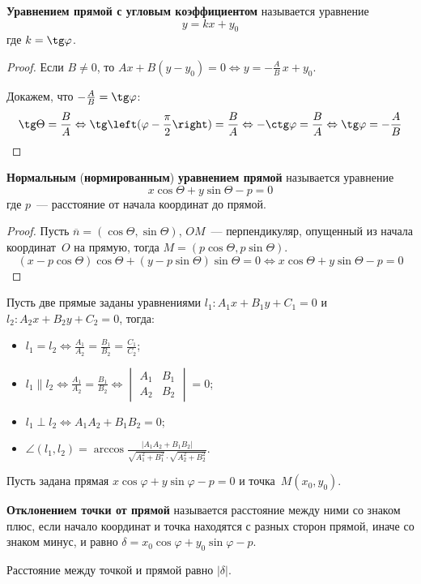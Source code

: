 \textbf{Уравнением прямой с угловым коэффициентом} называется уравнение
\begin{equation*}
y = kx + y_0
\end{equation*}
где $k = \tg \varphi$.
\begin{proof}
Если $B \neq 0$, то $Ax + B(y - y_0) = 0 \Leftrightarrow
y = -\frac{A}B\,x + y_0$.

Докажем, что $-\frac{A}B = \tg \varphi$:
\begin{equation*}
\tg \Theta = \frac{B}A \Leftrightarrow
\tg \left(\varphi - \frac\pi2\right) = \frac{B}A \Leftrightarrow
-\ctg \varphi = \frac{B}A \Leftrightarrow
\tg \varphi = -\frac{A}B
\end{equation*}
\end{proof}

\textbf{Нормальным} (\textbf{нормированным}) \textbf{уравнением прямой} называется уравнение
\begin{equation*}
x \cos \Theta + y \sin \Theta - p = 0
\end{equation*}
где $p$~--- расстояние от начала координат до прямой.
\begin{proof}
Пусть $\overline n = (\cos \Theta, \sin \Theta)$, $OM$~--- перпендикуляр, опущенный из начала координат~$O$ на прямую, тогда $M = (p \cos \Theta, p \sin \Theta)$.
\begin{equation*}
(x - p \cos \Theta) \cos \Theta + (y - p \sin \Theta) \sin \Theta = 0 \Leftrightarrow
x \cos \Theta + y \sin \Theta - p = 0
\end{equation*}
\end{proof}

Пусть две прямые заданы уравнениями $l_1 \colon A_1 x + B_1 y + C_1 = 0$ и $l_2 \colon A_2 x + B_2 y + C_2 = 0$, тогда:
\begin{itemize}
	\item $\displaystyle l_1 = l_2 \Leftrightarrow
	\frac{A_1}{A_2} = \frac{B_1}{B_2} = \frac{C_1}{C_2}$;
	\item $\displaystyle l_1 \parallel l_2 \Leftrightarrow
	\frac{A_1}{A_2} = \frac{B_1}{B_2} \Leftrightarrow
	\begin{vmatrix}
	A_1 & B_1 \\
	A_2 & B_2
	\end{vmatrix} = 0$;
	\item $\displaystyle l_1 \perp l_2 \Leftrightarrow
	A_1 A_2 + B_1 B_2 = 0$;
	\item $\displaystyle \angle(l_1, l_2) = \arccos \frac{|A_1 A_2 + B_1 B_2|}{\sqrt{A_1^2 + B_1^2} \cdot \sqrt{A_2^2 + B_2^2}}$.
\end{itemize}

Пусть задана прямая $x \cos \varphi + y \sin \varphi - p = 0$ и точка~$M(x_0, y_0)$.

 \textbf{Отклонением точки от прямой} называется расстояние между ними со знаком плюс, если начало координат и точка находятся с разных сторон прямой, иначе со знаком минус, и равно $\delta = x_0 \cos \varphi + y_0 \sin \varphi - p$.

Расстояние между точкой и прямой равно $|\delta|$.